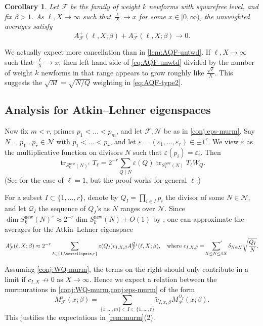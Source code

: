 \documentclass[11pt]{amsart}
\newcommand{\eps}{\varepsilon}
\newcommand{\new}{\mathrm{new}}
\DeclareMathOperator{\tr}{tr}
\numberwithin{lem}{section}
\newtheorem{cor}[lem]{Corollary}
\theoremstyle{remark}
\theoremstyle{definition}
\numberwithin{equation}{section}
\begin{document}
\begin{cor} \label{cor:63}
Let $\mathcal F$ be the family of weight $k$ newforms with squarefree level, and fix $\beta > 1$.  As $\ell, X \to \infty$ such that $\frac \ell X \to x$ for some $x \in [0, \infty)$, the unweighted averages satisfy
\[ A_{\mathcal F}^+(\ell,X; \beta) + A_{\mathcal F}^-(\ell,X; \beta) \to 0. \]
\end{cor}

We actually expect more cancellation than in \cref{lem:AQF-untwd}.
If $\ell, X \to \infty$ such that $\frac \ell X \to x$, then left hand side of \eqref{eq:AQF-unwtd} divided by the number of weight $k$ newforms in that range appears to grow roughly like $\frac{\sqrt \ell}X$.  This suggests the $\sqrt M = \sqrt{N/Q}$ weighting in \eqref{eq:AQF-type2}.  


\subsection{Analysis for Atkin--Lehner eigenspaces} \label{sec:eps-murm}
Now fix $m < r$, primes $p_1 <  \dots < p_m$, and let $\mathcal F, \mathcal N$ be as in  \cref{conj:eps-murm}.  Say $N = p_1 \dots p_r \in \mathcal N$ with $p_1 < \dots < p_r$, and let $\eps = (\eps_1, \dots, \eps_r) \in {\pm 1}^r$.  We view $\eps$ as the multiplicative function on divisors $N$ such that $\eps(p_i) = \eps_i$.  Then 
\[ \tr_{S_k^{\new}(N)^\eps} T_\ell = 2^{-r} \sum_{Q \mid N} \eps(Q) \tr_{S_k^\new(N)} T_\ell W_Q. \] 
(See \cite[Proposition 3.2]{me:refdim} for the case of $\ell = 1$, but the proof works for general $\ell$.)

For a subset $I \subset \{ 1, \dots, r \}$, denote by $Q_I = \prod_{i \in I} p_i$ the divisor of some $N \in \mathcal N$, and let $\mathcal Q_I$ the sequence of $Q_I$'s as $N$ ranges over $\mathcal N$.
Since $\dim S_k^{\new}(N)^\eps \approx 2^{-r} \dim S_k^{\new}(N) + O(1)$ by \cite[Corollary 3.4]{me:refdim}, one can approximate the averages for the Atkin--Lehner eigenspace
\[ A^\eps_{\mathcal F}(\ell,X; \beta) \approx 2^{-r} \sum_{I \subset \{ 1, \dots, r \} } \eps(Q_I) c_{I,X,\beta} A^{\mathcal Q_I}_{\mathcal F}(\ell,X; \beta), \quad \text{where } c_{I,X,\beta} =  \sideset{}{'}\sum_{X \le N \le \beta X}  \delta_{N \in \mathcal N} \sqrt{\frac{Q_I}N}. \]

Assuming \cref{conj:WQ-murm}, the terms on the right should only contribute in a limit if $c_{I,X} \not \to 0$ as $X \to \infty$.  Hence we expect 
a relation between the murmurations in \cref{conj:WQ-murm,conj:eps-murm} of the form
\begin{equation}
M^\eps_{\mathcal F}(x; \beta) = \sum_{\{1, \dots, m \} \subset I \subset \{ 1, \dots, r \} } \tilde c_{I,x,\beta} M_{\mathcal F}^{\mathcal Q_I}(x; \beta).
\end{equation}
This justifies the expectations in \cref{rem:murm}(2).
\end{document}
